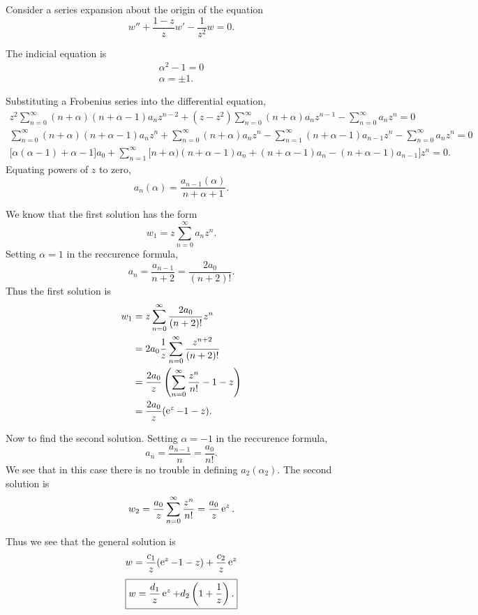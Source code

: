 \begin{Example}
  Consider a series expansion about the origin of the equation
  \[ w'' + \frac{1-z}{z} w' - \frac{1}{z^2} w = 0. \]

  The indicial equation is
  \begin{gather*}
    \alpha^2 -1 = 0 \\
    \alpha = \pm 1.
  \end{gather*}

  Substituting a Frobenius series into the differential equation,
  \begin{gather*}
    z^2 \sum_{n=0}^\infty (n+\alpha)(n+\alpha-1) a_n z^{n-2} + (z-z^2)\sum_{n=0}^\infty (n+\alpha)
    a_n z^{n-1} - \sum_{n=0}^\infty a_n z^n = 0 \\
    \sum_{n=0}^\infty (n+\alpha)(n+\alpha-1) a_n z^n + \sum_{n=0}^\infty (n+\alpha)a_n z^n
    - \sum_{n=1}^\infty (n+\alpha-1)a_{n-1}z^n - \sum_{n=0}^\infty a_n z^n = 0 \\
    \Big[\alpha(\alpha-1) + \alpha - 1\Big] a_0 
    + \sum_{n=1}^\infty \Big[n+\alpha)(n+\alpha-1) a_n
    + (n+\alpha-1) a_n - (n+\alpha-1)a_{n-1}\Big] z^n = 0.
  \end{gather*}
  Equating powers of $z$ to zero,
  \[ a_n(\alpha) = \frac{a_{n-1}(\alpha)}{n+\alpha+1} . \]

  We know that the first solution has the form
  \[ w_1 = z \sum_{n=0}^\infty a_n z^n. \]
  Setting $\alpha = 1$ in the reccurence formula,
  \[ a_n = \frac{a_{n-1}}{n+2} = \frac{2 a_0}{(n+2)!}. \]
  Thus the first solution is
  \begin{align*}
    w_1     &= z \sum_{n=0}^\infty \frac{2 a_0}{(n+2)!} z^n \\
    &= 2 a_0 \frac{1}{z} \sum_{n=0}^\infty \frac{z^{n+2}}{(n+2)!} \\
    &= \frac{2 a_0}{z} \left( \sum_{n=0}^\infty \frac{z^n}{n!} - 1 - z \right) \\
    &= \frac{2 a_0}{z} (\mathop{\mathrm{e}}\nolimits^z - 1 - z).
  \end{align*}

  Now to find the second solution.  Setting $\alpha = -1$ in the reccurence 
  formula,
  \[ a_n = \frac{a_{n-1}}{n} = \frac{a_0}{n!}. \]
  We see that in this case there is no trouble in defining $a_2(\alpha_2)$.
  The second solution is
  \[ w_2 = \frac{a_0}{z} \sum_{n=0}^\infty \frac{z^n}{n!} = \frac{a_0}{z} \mathop{\mathrm{e}}\nolimits^z. \]

  Thus we see that the general solution is
  \[ w = \frac{c_1}{z} (\mathop{\mathrm{e}}\nolimits^z - 1 - z) + \frac{c_2}{z} \mathop{\mathrm{e}}\nolimits^z \]
  \[ \boxed{ w = \frac{d_1}{z} \mathop{\mathrm{e}}\nolimits^z + d_2 \left(1+\frac{1}{z} \right). } \]
\end{Example}
